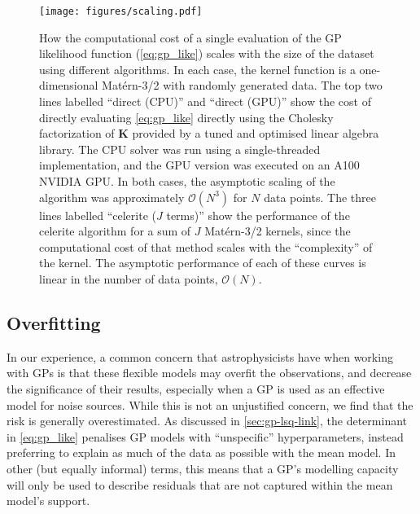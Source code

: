 \documentclass[letterpaper]{ar-1col}
\newcommand{\project}[1]{\textsf{#1}}
\begin{document}
\begin{figure}[ht]
  \centering
  \texttt{[image: figures/scaling.pdf]}
  \caption{How the computational cost of a single evaluation of the GP likelihood function (\autoref{eq:gp_like}) scales with the size of the dataset using different algorithms.
  In each case, the kernel function is a one-dimensional Mat\'ern-3/2 with randomly generated data.
  The top two lines labelled ``direct (CPU)'' and ``direct (GPU)'' show the cost of directly evaluating \autoref{eq:gp_like} directly using the Cholesky factorization of $\mathbf{K}$ provided by a tuned and optimised linear algebra library.
  The CPU solver was run using a single-threaded implementation, and the GPU version was executed on an \textsf{A100 NVIDIA} GPU.
  In both cases, the asymptotic scaling of the algorithm was approximately $\mathcal{O}(N^3)$ for $N$ data points.
  The three lines labelled ``celerite ($J$ terms)'' show the performance of the \project{celerite} algorithm \citep[][as implemented by the \project{tinygp} package]{celerite} for a sum of $J$ Mat\'ern-3/2 kernels, since the computational cost of that method scales with the ``complexity'' of the kernel.
  The asymptotic performance of each of these curves is linear in the number of data points, $\mathcal{O}(N)$.}
  \label{fig:scaling}
\end{figure}


\subsection{Overfitting}

In our experience, a common concern that astrophysicists have when working with GPs is that these flexible models may overfit the observations, and decrease the significance of their results, especially when a GP is used as an effective model for noise sources.
While this is not an unjustified concern, we find that the risk is generally overestimated.
As discussed in \autoref{sec:gp-lsq-link}, the determinant in \autoref{eq:gp_like} penalises GP models with ``unspecific'' hyperparameters, instead preferring to explain as much of the data as possible with the mean model.
In other (but equally informal) terms, this means that a GP's modelling capacity will only be used to describe residuals that are not captured within the mean model's support.
\end{document}
